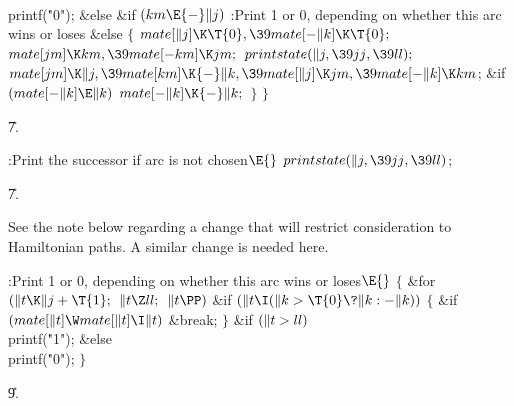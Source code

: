 \\{printf}(\.{"0"});\2\6
\&{else} \&{if} ${}(\\{km}\E{-}\|j){}$\1\5
:Print 1 or 0, depending on whether this arc wins or loses\X\2\6
\&{else}\5
${}\{{}$\1\6
${}\\{mate}[\|j]\K\T{0},\39\\{mate}[{-}\|k]\K\T{0};{}$\6
${}\\{mate}[\\{jm}]\K\\{km},\39\\{mate}[{-}\\{km}]\K\\{jm};{}$\6
${}\\{printstate}(\|j,\39\\{jj},\39\\{ll});{}$\6
${}\\{mate}[\\{jm}]\K\|j,\39\\{mate}[\\{km}]\K{-}\|k,\39\\{mate}[\|j]\K\\{jm},%
\39\\{mate}[{-}\|k]\K\\{km}{}$;\6
\&{if} ${}(\\{mate}[{-}\|k]\E\|k){}$\1\5
${}\\{mate}[{-}\|k]\K{-}\|k;{}$\2\6
\4${}\}{}$\2\6
\4${}\}{}$\2\par
\U7.\fi

\B{}:Print the successor if arc 
is not chosen\X${}\E{}$\6
$\\{printstate}(\|j,\39\\{jj},\39\\{ll}){}$;\par
\U7.\fi

See the note below regarding a change that
will restrict consideration
to Hamiltonian paths. A similar change is needed here.

\Y\B\4:Print 1 or 0, depending on whether this arc wins or loses\X${}\E{}$\6
${}\{{}$\1\6
\&{for} ${}(\|t\K\|j+\T{1};{}$ ${}\|t\Z\\{ll};{}$ ${}\|t\PP){}$\1\6
\&{if} ${}(\|t\I(\|k>\T{0}\?\|k:{-}\|k)){}$\5
${}\{{}$\1\6
\&{if} ${}(\\{mate}[\|t]\W\\{mate}[\|t]\I\|t){}$\1\5
\&{break};\2\6
\4${}\}{}$\2\2\6
\&{if} ${}(\|t>\\{ll}){}$\1\5
\\{printf}(\.{"1"});\2\6
\&{else}\1\5
\\{printf}(\.{"0"});\2\6
\4${}\}{}$\2\par
\U9.\fi

